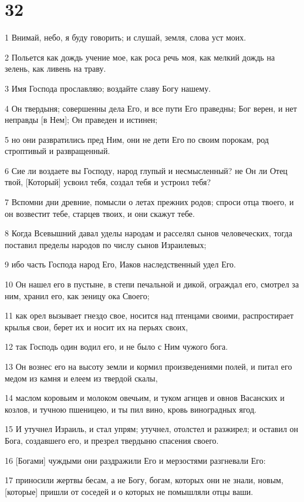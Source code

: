 \chapter{32}

\par 1 Внимай, небо, я буду говорить; и слушай, земля, слова уст моих.
\par 2 Польется как дождь учение мое, как роса речь моя, как мелкий дождь на зелень, как ливень на траву.
\par 3 Имя Господа прославляю; воздайте славу Богу нашему.
\par 4 Он твердыня; совершенны дела Его, и все пути Его праведны; Бог верен, и нет неправды [в Нем]; Он праведен и истинен;
\par 5 но они развратились пред Ним, они не дети Его по своим порокам, род строптивый и развращенный.
\par 6 Сие ли воздаете вы Господу, народ глупый и несмысленный? не Он ли Отец твой, [Который] усвоил тебя, создал тебя и устроил тебя?
\par 7 Вспомни дни древние, помысли о летах прежних родов; спроси отца твоего, и он возвестит тебе, старцев твоих, и они скажут тебе.
\par 8 Когда Всевышний давал уделы народам и расселял сынов человеческих, тогда поставил пределы народов по числу сынов Израилевых;
\par 9 ибо часть Господа народ Его, Иаков наследственный удел Его.
\par 10 Он нашел его в пустыне, в степи печальной и дикой, ограждал его, смотрел за ним, хранил его, как зеницу ока Своего;
\par 11 как орел вызывает гнездо свое, носится над птенцами своими, распростирает крылья свои, берет их и носит их на перьях своих,
\par 12 так Господь один водил его, и не было с Ним чужого бога.
\par 13 Он вознес его на высоту земли и кормил произведениями полей, и питал его медом из камня и елеем из твердой скалы,
\par 14 маслом коровьим и молоком овечьим, и туком агнцев и овнов Васанских и козлов, и тучною пшеницею, и ты пил вино, кровь виноградных ягод.
\par 15 И утучнел Израиль, и стал упрям; утучнел, отолстел и разжирел; и оставил он Бога, создавшего его, и презрел твердыню спасения своего.
\par 16 [Богами] чуждыми они раздражили Его и мерзостями разгневали Его:
\par 17 приносили жертвы бесам, а не Богу, богам, которых они не знали, новым, [которые] пришли от соседей и о которых не помышляли отцы ваши.
